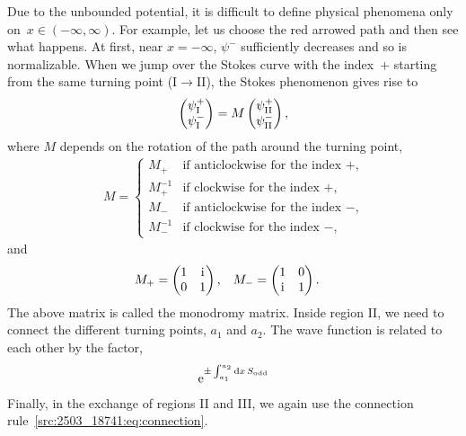 Due to the unbounded potential, it is difficult to define physical phenomena only on~$x\in(-\infty,\infty)$.
For example, let us choose the red arrowed path and then see what happens.
At first, near $x=-\infty$, $\psi^{-}$ sufficiently decreases and so is normalizable.
When we jump over the Stokes curve with the index~$+$ starting from the same turning point (I$\to$II), the Stokes phenomenon gives rise to
\begin{align}
    \begin{pmatrix}
      \psi^{+}_{\mathrm{I}} \\ \psi^{-}_{\mathrm{I}}
    \end{pmatrix}
    =
    M
    \begin{pmatrix}
      \psi^{+}_{\mathrm{II}} \\ \psi^{-}_{\mathrm{II}}
    \end{pmatrix} ,
    \label{src:2503_18741:eq:connection}
\end{align}
where $M$ depends on the rotation of the path around the turning point,
\begin{align}
    M =
    \begin{cases}
        M_{+} & \text{if anticlockwise for the index~$+$,} \\
        M_{+}^{-1}& \text{if clockwise for the index~$+$,} \\
        M_{-} & \text{if anticlockwise for the index~$-$,} \\
        M_{-}^{-1} &\text{if clockwise for the index~$-$,}
    \end{cases}
\end{align}
and
\begin{align}
    M_{+} &=
    \begin{pmatrix}
        1 & \mathrm{i} \\ 0 & 1
    \end{pmatrix}, &
    M_{-} &=
    \begin{pmatrix}
        1 & 0 \\ \mathrm{i} & 1
    \end{pmatrix} .
\end{align}
The above matrix is called the monodromy matrix.
Inside region II, we need to connect the different turning points, $a_1$ and $a_2$.
The wave function is related to each other by the factor,
\begin{align}
    \mathrm{e}^{\pm\int_{a_1}^{a_2}\mathrm{d} x\, S_{\mathrm{odd}}}
\end{align}
Finally, in the exchange of regions II and III, we again use the connection rule~\eqref{src:2503_18741:eq:connection}.
